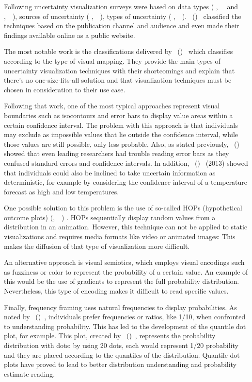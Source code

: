 \documentclass[a4paper,3p,sort&compress]{elsarticle}
\DeclareRobustCommand{\citeext}[1]{\citeauthor{#1},~\citeyear{#1}~\cite{#1}}
\DeclareRobustCommand{\citeextp}[1]{\citeauthor{#1}~(\citeyear{#1})~\cite{#1}}
\begin{document}
Following uncertainty visualization surveys were based on data types (
  \citeext{potter_quantification_2012} and 
  \citeext{brodlie_review_2012}), sources of uncertainty (
  \citeext{bonneau_overview_2014}), types of uncertainty (
\citeext{ristovski_uncertainty_2014}). \citeextp{jena_uncertainty_2020}
classified the techniques based on the publication channel and audience and even
made their findings available online as a public website.

The most notable work is the classifications delivered by 
\citeextp{padilla_uncertainty_2021} which classifies according to the type of visual
mapping. They provide the main types of uncertainty visualization techniques
with their shortcomings and explain that there's no one-size-fits-all solution
and that visualization techniques must be chosen in consideration to their use
case.

Following that work, one of the most typical approaches represent visual
boundaries such as isocontours and error bars to display value areas within a
certain confidence interval. The problem with this approach is that individuals
may exclude as impossible values that lie outside the confidence interval, while
those values are still possible, only less probable. Also, as stated previously,
\citeextp{belia_researchers_2005} showed that even leading researchers
had trouble reading error bars as they confused standard errors and confidence
intervals. In addition, \citeextp{joslyn_decisions_2013} (2013) showed
that individuals could also be inclined to take uncertain information as
deterministic, for example by considering the confidence interval of a
temperature forecast as high and low temperatures.

One possible solution to this problem is the use of so-called HOPs (hypothetical
outcome plots) (\citeext{hullman_hypothetical_2015}) . 
HOPs sequentially display random
values from a distribution in an animation. However, this technique can not be
applied to static visualizations and requires media formats like video or
animated images: This makes the diffusion of that type of visualization more
difficult.

An alternative approach is visual semiotics, which employs visual encodings such
as fuzziness or color to represent the probability of a certain value. An
example of this would be the use of gradients to represent the full probability
distribution. Nevertheless, this type of encoding makes it difficult to read
specific values.

Finally, frequency framing uses natural frequencies to display probabilities. As
noted by \citeextp{gigerenzer_psychology_1996}, individuals prefer frequencies
or ratios, like 1/10, when confronted to understanding probability. This has led
to the development of the quantile dot plot, for example. This plot, created by
 \citeextp{2016-when-ish-is-my-bus}, represents the probability
distribution with dots: by using 20 dots, each would represent 1/20 probability
and they are placed according to the quantiles of the distribution. Quantile dot
plots have proved to lead to better distribution understanding and probability
estimate reading.
\end{document}
